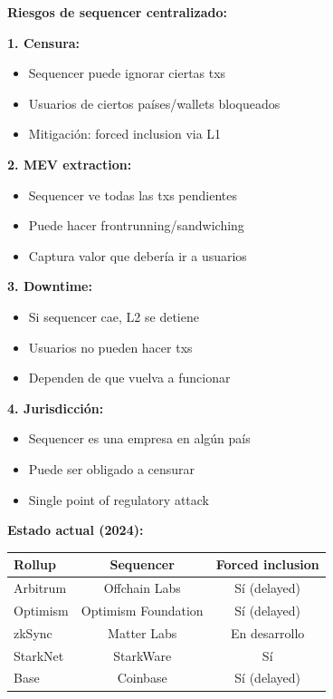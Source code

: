 \documentclass[11pt,a4paper,twoside,openright]{book}
\theoremstyle{definition}
\theoremstyle{plain}
\theoremstyle{remark}
\begin{document}
\begin{advertencia}
\textbf{Riesgos de sequencer centralizado:}

\textbf{1. Censura:}
\begin{itemize}
    \item Sequencer puede ignorar ciertas txs
    \item Usuarios de ciertos países/wallets bloqueados
    \item Mitigación: forced inclusion via L1
\end{itemize}

\textbf{2. MEV extraction:}
\begin{itemize}
    \item Sequencer ve todas las txs pendientes
    \item Puede hacer frontrunning/sandwiching
    \item Captura valor que debería ir a usuarios
\end{itemize}

\textbf{3. Downtime:}
\begin{itemize}
    \item Si sequencer cae, L2 se detiene
    \item Usuarios no pueden hacer txs
    \item Dependen de que vuelva a funcionar
\end{itemize}

\textbf{4. Jurisdicción:}
\begin{itemize}
    \item Sequencer es una empresa en algún país
    \item Puede ser obligado a censurar
    \item Single point of regulatory attack
\end{itemize}

\textbf{Estado actual (2024):}

\begin{center}
\begin{tabular}{lcc}
\toprule
\textbf{Rollup} & \textbf{Sequencer} & \textbf{Forced inclusion} \\
\midrule
Arbitrum & Offchain Labs & Sí (delayed) \\
Optimism & Optimism Foundation & Sí (delayed) \\
zkSync & Matter Labs & En desarrollo \\
StarkNet & StarkWare & Sí \\
Base & Coinbase & Sí (delayed) \\
\bottomrule
\end{tabular}
\end{center}
\end{advertencia}
\end{document}
